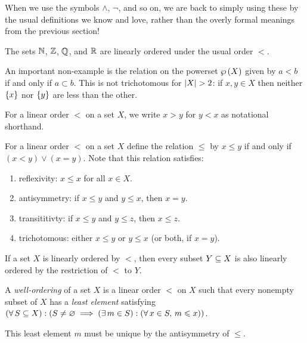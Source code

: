 \documentclass{article}
\begin{document}
\begin{note}
	When we use the symbols $\land$, $\lnot$, and so on, we are back to simply using these by the usual definitions we know and love, rather than the overly formal meanings from the previous section!
\end{note}

\begin{example}
    The sets $\mathbb{N}$, $\mathbb{Z}$, $\mathbb{Q}$, and $\mathbb{R}$ are linearly ordered under the usual order $<$.
    
    An important non-example is the relation on the powerset $\wp\left(X\right)$ given by $a < b$ if and only if $a \subset b$. This is not trichotomous for $\left\lvert X \right\rvert > 2$: if $x, y \in X$ then neither $\left\lbrace x \right\rbrace$ nor $\left\lbrace y \right\rbrace$ are less than the other.
\end{example}

\begin{note}
	For a linear order $<$ on a set $X$, we write $x > y$ for $y < x$ as notational shorthand.
\end{note}

\begin{definition}[$\leq$]
    For a linear order $<$ on a set $X$ define the relation $\leq$ by $x \leq y$ if and only if $(x<y) \lor (x = y)$. Note that this relation satisfies:
    \begin{enumerate}
    	\item reflexivity: $x \leq x$ for all $x \in X$.
    	\item antisymmetry: if $x \leq y$ and $y \leq x$, then $x = y$.
    	\item transititivty: if $x \leq y$ and $y \leq z$, then $x \leq z$.
    	\item trichotomous: either $x \leq y$ or $y \leq x$ (or both, if $x = y$).
	\end{enumerate}
\end{definition}

\begin{note}
	If a set $X$ is linearly ordered by $<$, then every subset $Y \subseteq X$ is also linearly ordered by the restriction of $<$ to $Y$.
\end{note}

\begin{definition}
    A \textit{well-ordering} of a set $X$ is a linear order $<$ on $X$ such that every nonempty subset of $X$ has a \textit{least element} satisfying $(\forall \, S \subseteq X) : (S \neq \varnothing \implies (\exists \, m \in S) : (\forall \, x \in S, \, m \leqslant x))$.
    
	This least element $m$ must be unique by the antisymmetry of $\leq$.
\end{definition}
\end{document}
